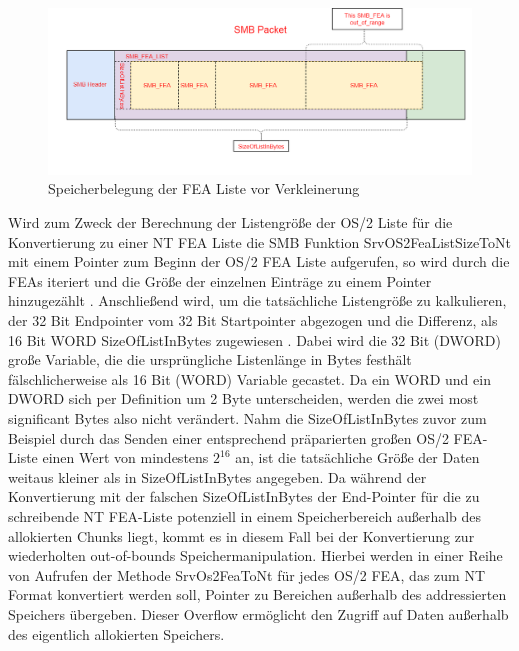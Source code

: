 \documentclass[DIV=12,headings=normal,pdftex,headinclude=false,footinclude=false,final]{scrreprt}
\begin{document}
\begin{figure}[H]
    \centering
    \includegraphics[width=15cm]{checkpoint_before_shrink.png}
    \caption[FEAList vor Verkleinerung, Nadav Grossmann (Checkpoint Research),URL: \url{https://research.checkpoint.com/wp-content/uploads/2017/09/eternalblue4.png}]{Speicherbelegung der FEA Liste vor Verkleinerung}
    \label{img:fealist_before_shrinking}
\end{figure}

\noindent
Wird zum Zweck der Berechnung der Listengröße der OS/2 Liste für die Konvertierung zu einer NT FEA Liste die SMB Funktion SrvOS2FeaListSizeToNt mit einem Pointer zum Beginn der OS/2 FEA Liste aufgerufen, so wird durch die FEAs iteriert und die Größe der einzelnen Einträge zu einem Pointer hinzugezählt \cite{TM:EB}.
Anschließend wird, um die tatsächliche Listengröße zu kalkulieren, der 32 Bit Endpointer vom 32 Bit Startpointer abgezogen und die Differenz, als 16 Bit WORD SizeOfListInBytes zugewiesen \cite{Scad:EB}.
Dabei wird die 32 Bit (DWORD) große Variable, die die ursprüngliche Listenlänge in Bytes festhält fälschlicherweise als 16 Bit (WORD) Variable gecastet. Da ein WORD und ein DWORD sich per Definition um 2 Byte unterscheiden, werden die zwei most significant Bytes also nicht verändert. Nahm die SizeOfListInBytes zuvor zum Beispiel durch das Senden einer entsprechend präparierten großen OS/2 FEA-Liste einen Wert von mindestens $2^{16}$ an, ist die tatsächliche Größe der Daten weitaus kleiner als in SizeOfListInBytes angegeben\cite{Medium:ExpBible}. Da während der Konvertierung mit der falschen SizeOfListInBytes der End-Pointer für die zu schreibende NT FEA-Liste potenziell in einem Speicherbereich außerhalb des allokierten Chunks liegt, kommt es in diesem Fall bei der Konvertierung zur wiederholten out-of-bounds Speichermanipulation. Hierbei werden in einer Reihe von Aufrufen der Methode SrvOs2FeaToNt für jedes OS/2 FEA, das zum NT Format konvertiert werden soll, Pointer zu Bereichen außerhalb des addressierten Speichers übergeben\cite{Scad:EB}. Dieser Overflow ermöglicht den Zugriff auf Daten außerhalb des eigentlich allokierten Speichers.
\end{document}

